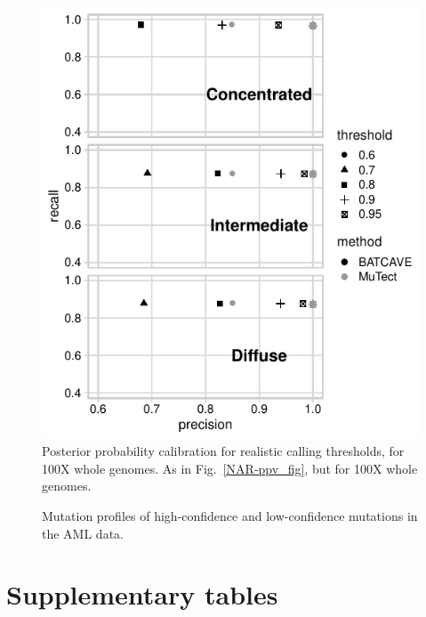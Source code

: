 \documentclass[a4,center,fleqn]{NAR}
\begin{document}
\begin{figure} [H]
\centering
  \includegraphics{figures/ppv_wgs.pdf}
  \caption{Posterior probability calibration for realistic calling thresholds, for 100X whole genomes. As in Fig.~\ref{NAR-ppv_fig}, but for 100X whole genomes.}
\label{NAR-ppv_wgs_fig}
\end{figure}

\begin{figure} [H]
\centering
  \caption{Mutation profiles of high-confidence and low-confidence mutations in the AML data.}
\label{fig:AML_profiles}
\end{figure}

\section{Supplementary tables}
\end{document}
